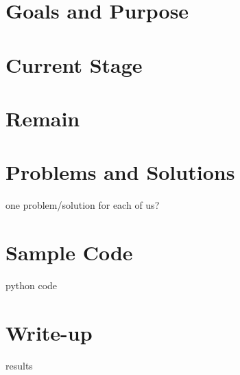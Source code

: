\section{Goals and Purpose}

\section{Current Stage}

\section{Remain}

\section{Problems and Solutions}
one problem/solution for each of us?


\section{Sample Code}
python code

\section{Write-up}
results